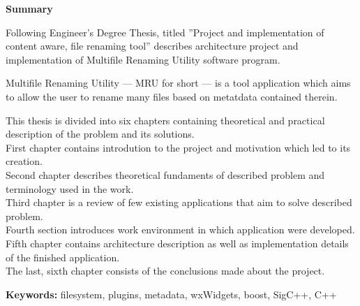\clearpage

\begin{center}
\textbf{Summary}
\end{center}

\par
Following Engineer's Degree Thesis, titled ''Project and implementation of content aware, file renaming tool'' describes architecture project and implementation of Multifile Renaming Utility software program.

\par
Multifile Renaming Utility --- MRU for short --- is a tool application which aims to allow the user to rename many files based on metatdata contained therein.

\par
This thesis is divided into six chapters containing theoretical and practical description of the problem and its solutions.\\
First chapter contains introdution to the project and motivation which led to its creation.\\
Second chapter describes theoretical fundaments of described problem and terminology used in the work.\\
Third chapter is a review of few existing applications that aim to solve described problem.\\
Fourth section introduces work environment in which application were developed.\\
Fifth chapter contains architecture description as well as implementation details of the finished application.\\
The last, sixth chapter consists of the conclusions made ​​about the project.

\vspace*{\baselineskip}

\noindent\textbf{Keywords:} filesystem, plugins, metadata, wxWidgets, boost, SigC++, C++

